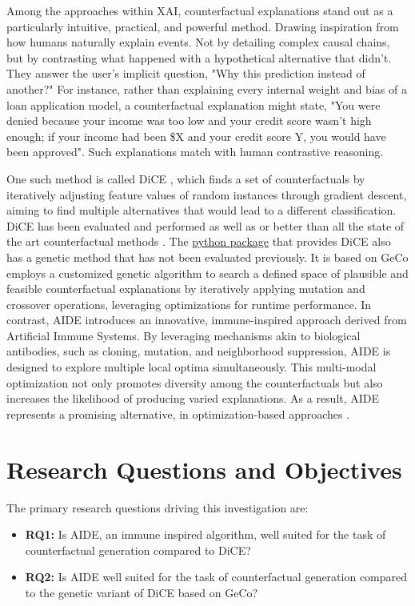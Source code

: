 Among the approaches within XAI, counterfactual explanations stand out as a particularly intuitive, practical, and powerful method. Drawing inspiration from how humans naturally explain events. Not by detailing complex causal chains, but by contrasting what happened with a hypothetical alternative that didn't. They answer the user's implicit question, "Why this prediction instead of another?" For instance, rather than explaining every internal weight and bias of a loan application model, a counterfactual explanation might state, "You were denied because your income was too low and your credit score wasn't high enough; if your income had been \$X and your credit score Y, you would have been approved". Such explanations match with human contrastive reasoning. 

One such method is called DiCE \citep{mothilal2020explaining}, which finds a set of counterfactuals by iteratively adjusting feature values of random instances through gradient descent, aiming to find multiple alternatives that would lead to a different classification. DiCE has been evaluated and performed as well as or better than all the state of the art counterfactual methods \citep{guidotti2024counterfactual}. The \href{https://pypi.org/project/dice-ml/}{python package} that provides DiCE also has a genetic method that has not been evaluated previously. It is based on GeCo employs a customized genetic algorithm to search a defined space of plausible and feasible counterfactual explanations by iteratively applying mutation and crossover operations, leveraging optimizations for runtime performance. In contrast, AIDE introduces an innovative, immune-inspired approach derived from Artificial Immune Systems. By leveraging mechanisms akin to biological antibodies, such as cloning, mutation, and neighborhood suppression, AIDE is designed to explore multiple local optima simultaneously. This multi-modal optimization not only promotes diversity among the counterfactuals but also increases the likelihood of producing varied explanations. As a result, AIDE represents a promising alternative, in optimization-based approaches \citep{forrest2021contrastive}.

\section{Research Questions and Objectives}
The primary research questions driving this investigation are:
\newline
\begin{mdframed}[backgroundcolor=white,linecolor=black,linewidth=2pt]
\begin{itemize} \label{research-questions}
    \item \textbf{RQ1:} Is AIDE, an immune inspired algorithm, well suited for the task of counterfactual generation compared to DiCE? 
    \item \textbf{RQ2:} Is AIDE well suited for the task of counterfactual generation compared to the genetic variant of DiCE based on GeCo?
\end{itemize}
\end{mdframed}


